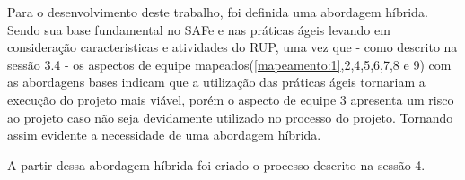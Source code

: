 Para o desenvolvimento deste trabalho, foi definida uma abordagem híbrida.
Sendo sua base fundamental no SAFe e nas práticas ágeis levando em consideração
caracteristicas e atividades do RUP, uma vez que - como descrito na sessão 3.4
- os aspectos de equipe mapeados(\ref{mapeamento:1},2,4,5,6,7,8 e 9) com as abordagens bases
indicam que a utilização das práticas ágeis tornariam a execução do projeto mais
viável, porém o aspecto de equipe 3 apresenta um risco ao projeto caso não seja
devidamente utilizado no processo do projeto. Tornando assim evidente a necessidade
de uma abordagem híbrida.

A partir dessa abordagem híbrida foi criado o processo descrito na sessão 4.
